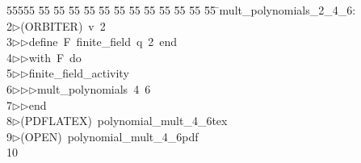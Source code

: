 %
%
\begin{tabbing}
55555 \= 55 \= 55 \= 55 \= 55 \= 55 \= 55 \= 55 \= 55 \= 55 \= 55 \= 55 \= 55 \= \>mult\_polynomials\_2\_4\_6:\\[0pt]
2\>$\triangleright$\>(ORBITER)\ v\ 2\ \\[0pt]
3\>$\triangleright$\>$\triangleright$\>define\ F\ finite\_field\ q\ 2\ end\ \\[0pt]
4\>$\triangleright$\>$\triangleright$\>with\ F\ do\ \\[0pt]
5\>$\triangleright$\>$\triangleright$\>finite\_field\_activity\ \\[0pt]
6\>$\triangleright$\>$\triangleright$\>$\triangleright$\>mult\_polynomials\ 4\ 6\ \\[0pt]
7\>$\triangleright$\>$\triangleright$\>end\\[0pt]
8\>$\triangleright$\>(PDFLATEX)\ polynomial\_mult\_4\_6tex\\[0pt]
9\>$\triangleright$\>(OPEN)\ polynomial\_mult\_4\_6pdf\\[0pt]
10\>\end{tabbing}
